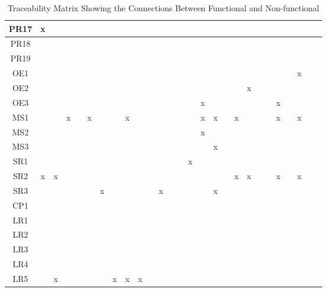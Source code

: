 \documentclass[12pt]{article}
\begin{document}
\begin{landscape}
\begin{table}[H]
{\begin{tabular}{|c|c|c|c|c|c|c|c|c|c|c|c|c|c|c|c|c|c|c|c|c|c|c|c|c|c|c|}
PR17& x& & & & & & & &&&&&&&&&&&&&&&&&&\\ \hline
PR18& & & & & & & & &&&&&&&&&&&&&&&&&&\\ \hline
PR19& & & & & & & & &&&&&&&&&&&&&&&&&&\\ \hline
OE1& & & & & & & & &&&&&&&&&&&&&&&&x&&\\ \hline
OE2& & & & & & & & &&&&&&&&&&&x&&&&&&&\\ \hline
OE3& & & & & & & & &&&&&&&x&&&&&&&x&&&&\\ \hline
MS1& & & x& & x& & & x&&&&&&&x&x&&x&&&&x&&x&&\\ \hline
MS2& & & & & & & & & &&&&&&x&&&&&&&&&&&\\ \hline
MS3& & & & & & & & &&&&&&&&x&&&&&&&&&&\\ \hline
SR1& & & & & & & & & &&&&&x&&&&&&&&&&&&\\ \hline
SR2& x& x& & & & & & &&&&&&&&&&x&x&&&x&&x&& \\ \hline
SR3& & & & & & x& & &&&x&&&&&x&&&&&&&&&& \\ \hline
CP1& & & & & & & & &&&&&&&&&&&&&&&&&& \\ \hline
LR1& & & & & & & & & &&&&&&&&&&&&&&&&&\\ \hline
LR2& & & & & & & & & &&&&&&&&&&&&&&&&&\\ \hline
LR3& & & & & & & & &&&&&&&&&&&&&&&&&& \\ \hline
LR4& & & & & & & & & &&&&&&&&&&&&&&&&&\\ \hline
LR5& & x& & & & & x& x& x &&&&&&&&&&&&&&&&&\\ \hline

\end{tabular}}
\caption{Traceability Matrix Showing the Connections Between Functional and Non-functional}
\end{table}
\end{landscape}

\noindent {}
\end{document}
